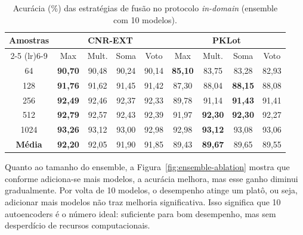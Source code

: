 \documentclass{article}
\begin{document}
\begin{table}[!htbp]
\centering
\footnotesize
\caption{Acurácia (\%) das estratégias de fusão no protocolo \textit{in-domain} (ensemble com 10 modelos).}
\label{tab:fusion_indomain_comparison}

\renewcommand{\arraystretch}{1.05}
\setlength{\tabcolsep}{5pt}

\begin{tabular}{ccccccccc}
\toprule
\multirow{2}{*}{\textbf{Amostras}} &
\multicolumn{4}{c}{\textbf{CNR-EXT}} &
\multicolumn{4}{c}{\textbf{PKLot}} \\
\cmidrule(lr){2-5}
\cmidrule(lr){6-9}
& Max & Mult. & Soma & Voto &
Max & Mult. & Soma & Voto \\
\midrule

64
& \textbf{90,70} & 90,48 & 90,24 & 90,14
& \textbf{85,10} & 83,75 & 83,28 & 82,93 \\

128
& \textbf{91,76} & 91,62 & 91,45 & 91,42
& 87,30 & 88,04 & \textbf{88,15} & 88,08 \\

256
& \textbf{92,49} & 92,46 & 92,37 & 92,33
& 89,78 & 91,14 & \textbf{91,43} & 91,41 \\

512
& \textbf{92,79} & 92,57 & 92,43 & 92,39
& 91,97 & \textbf{92,30} & \textbf{92,30} & 92,27 \\

1024
& \textbf{93,26} & 93,12 & 93,00 & 92,98
& 92,98 & \textbf{93,12} & 93,08 & 93,06 \\

\midrule

\textbf{Média}
& \textbf{92,20} & 92,05 & 91,90 & 91,85
& 89,43 & \textbf{89,67} & 89,65 & 89,55 \\

\bottomrule
\end{tabular}

\end{table}

Quanto ao tamanho do ensemble, a Figura~\ref{fig:ensemble-ablation} mostra que conforme adiciona-se mais modelos, a acurácia melhora, mas esse ganho diminui gradualmente. Por volta de 10 modelos, o desempenho atinge um platô, ou seja, adicionar mais modelos não traz melhoria significativa. Isso significa que 10 autoencoders é o número ideal: suficiente para bom desempenho, mas sem desperdício de recursos computacionais.
\end{document}
